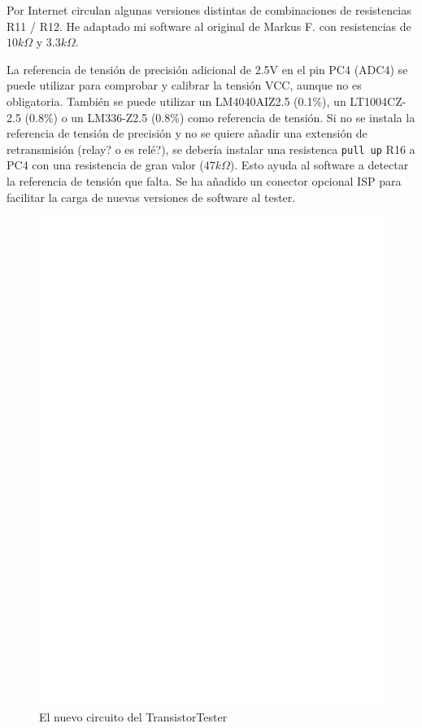 Por Internet circulan algunas versiones distintas de combinaciones de resistencias R11 / R12. He adaptado mi software al
original de Markus F. \cite{Frejek} con resistencias de \(10k\Omega\) y \(3.3k\Omega\).

La referencia  de tensión de  precisión adicional  de 2.5V en  el pin PC4  (ADC4) se  puede utilizar para  comprobar y
calibrar la tensión VCC, aunque no es obligatoria.  También se puede utilizar un LM4040AIZ2.5 (0.1\%), un LT1004CZ-2.5
(0.8\%) o un LM336-Z2.5 (0.8\%) como referencia de tensión. Si  no se instala la referencia de tensión de precisión y
no  se quiere  añadir una  extensión de  retransmisión  (relay? o  es relé?),  se debería  instalar una  resistenca
\texttt{pull up}  R16 a PC4  con una resistencia  de gran valor  (\(47k\Omega\)). Esto ayuda  al software a  detectar la
referencia de tensión que falta. Se ha añadido un conector opcional ISP para facilitar la carga de nuevas versiones de
software al tester.

\begin{figure}[H]
\centering
\includegraphics[width=18cm]{../FIG/ttester.eps}
\caption{El nuevo circuito del TransistorTester}
\label{fig:ttester}
\end{figure}

